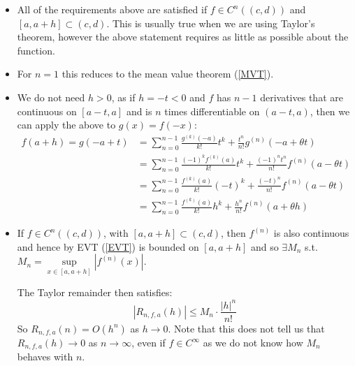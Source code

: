 \documentclass[../main.tex]{subfiles}
\begin{document}
\begin{remark}[Remarks]
  \begin{itemize}
    \item All of the requirements above are satisfied if $f \in C^{n}((c, d))$ and $[a, a + h] \subset (c, d)$.
      This is usually true when we are using Taylor's theorem, however the above statement requires as little as possible about the function.
    \item For $n = 1$ this reduces to the mean value theorem (\cref{MVT}).
    \item We do not need $h > 0$, as if $h = -t < 0$ and $f$ has $n - 1$ derivatives that are continuous on $[a - t, a]$ and is $n$ times differentiable on $(a - t, a)$, then we can apply the above to $g(x) = f(-x)$:
      \begin{align*}
        f(a + h) = g(-a + t) &= \sum_{n=0}^{n - 1} \frac{g^{(k)}(-a)}{k!} t^{k} + \frac{t^{n}}{n!}g^{(n)}(-a + \theta t) \\
                             &= \sum_{n=0}^{n - 1} \frac{(-1)^{k}f^{(k)}(a)}{k!} t^{k} + \frac{(-1)^{n}t^{n}}{n!}f^{(n)}(a - \theta t) \\
                             &= \sum_{n=0}^{n - 1} \frac{f^{(k)}(a)}{k!} (-t)^{k} + \frac{(-t)^{n}}{n!}f^{(n)}(a - \theta t) \\
                             &= \sum_{n=0}^{n - 1} \frac{f^{(k)}(a)}{k!} h^{k} + \frac{h^{n}}{n!}f^{(n)}(a + \theta h)
      \end{align*}
    \item If $f \in C^{n}((c, d))$, with $[a, a + h] \subset (c, d)$, then $f^{(n)}$ is also continuous and hence by EVT (\cref{EVT}) is bounded on $[a, a + h]$ and so $\exists M_n$ s.t. $M_n = \sup\limits_{x \in [a, a + h]} |f^{(n)}(x)|$.

      The Taylor remainder then satisfies:
      \[
        |R_{n, f, a}(h)| \leq M_n \cdot \frac{|h|^{n}}{n!}
      \]
      So $R_{n, f, a}(n) = O(h^{n})$ as $h \to 0$.
      Note that this does not tell us that $R_{n, f, a}(h) \to 0$ as $n \to \infty$, even if $f \in C^{\infty}$ as we do not know how $M_n$ behaves with $n$.
  \end{itemize}
\end{remark}
\end{document}

